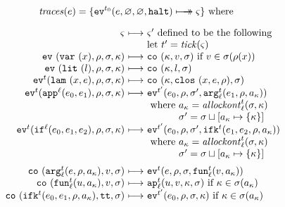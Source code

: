 \documentclass[9pt]{sigplanconf} %
\begin{document}
\begin{figure}
\small
\begin{gather*}
\begin{align*}
\traces(\mexp) &= \{ \ev[^{\mtcntr}]{\mexp,\varnothing,\varnothing,\kmt} \multimachstep \mstate \} \text{ where }
\end{align*}
\\[2mm]
\begin{array}{@{}r@{\ }c@{\ }l@{}}
\mstate &\machstep&\mstate' \text{ defined to be the following} \\
&&\text{let } \mcntr' =\tick(\mstate) \\
\ev{\svar\mvar,\menv,\msto,\mkont} &\machstep&
\co{\mkont,\mval,\msto}
\text{ if }\mval \in \msto(\menv(\mvar))
\\
\ev{\slit\mlit,\menv,\msto,\mkont} &\machstep&
\co{\mkont,\mlit,\msto}
\\
\ev[^\mcntr]{\slam\mvar\mexp,\menv,\msto,\mkont} &\machstep&
\co{\mkont,\clos{\mvar,\mexp,\menv},\msto}
\\
\ev[^\mcntr]{\sapp[^\mlab]{\mexpi0}{\mexpi1},\menv,\msto,\mkont} &\machstep&
\ev[^{\mcntr'}]{\mexpi{0},\menv,\msto',\kar[_\mlab^\mcntr]{\mexpi{1},\menv,\mkaddr}}
\\
&&
\text{ where }\mkaddr = \allockont^\mcntr_\mlab(\msto,\mkont) \\
&&\phantom{\text{ where }}\msto' = \msto\sqcup[\mkaddr \mapsto \setof{\mkont}]
\\
\ev[^\mcntr]{\sif[^\mlab]{\mexpi0}{\mexpi1}{\mexpi2},\menv,\msto,\mkont} &\machstep&
\ev[^{\mcntr'}]{\mexpi0,\menv,\msto',\kif[^\mcntr]{\mexpi1,\mexpi2,\menv,\mkaddr}}
\\
&&
\text{ where }\mkaddr = \allockont^\mcntr_\mlab(\msto,\mkont) \\
&&\phantom{\text{ where }}\msto' = \msto\sqcup[\mkaddr \mapsto \setof{\mkont}]
\\[2mm]
\co{\kar[^\mcntr_\mlab]{\mexp,\menv,\mkaddr},\mval,\msto} & \machstep&
\ev[^\mcntr]{\mexp,\menv,\msto,\kfn[^\mcntr_\mlab]{\mval,\mkaddr}}
\\
\co{\kfn[^\mcntr_\mlab]{{\mvalx{u}},\mkaddr},\mval,\msto} & \machstep&
\ap[^\mcntr_\mlab]{\mvalx{u},\mval,\mkont,\msto}
\text{ if }\mkont \in \msto(\mkaddr)
\\
\co{\kif[^\mcntr]{\mexpi0,\mexpi1,\menv,\mkaddr},\strue,\msto} & \machstep&
\ev[^{\mcntr'}]{\mexpi0,\menv,\msto,\mkont}
\text{ if }\mkont\in\msto(\mkaddr)

\end{array}
\end{gather*}
\end{figure}
\end{document}
